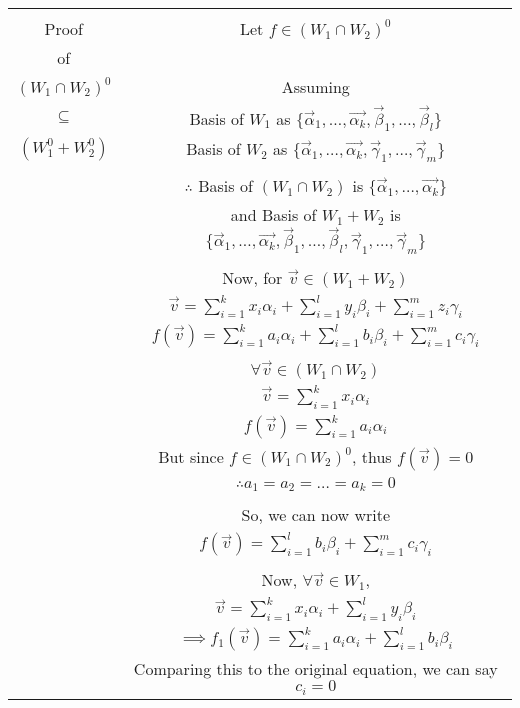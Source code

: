 \documentclass[journal,12pt,twocolumn]{IEEEtran}
\begin{document}
\begin{table}[h!]
\begin{center}
\begin{tabular}{|c|c|}
\hline
& \\
Proof & Let $f \in (W_1 \cap W_2)^0$\\
of & \\
$(W_1 \cap W_2)^0$ & Assuming\\
$\subseteq$ & Basis of $W_1$ as $\{ \vec{\alpha}_1,\ldots,\vec{\alpha_k}, \vec{\beta}_1,\ldots,\vec{\beta}_l \}$\\
$(W_1^0 + W_2^0)$ & Basis of $W_2$ as $\{ \vec{\alpha}_1,\ldots,\vec{\alpha_k}, \vec{\gamma}_1,\ldots,\vec{\gamma}_m \}$\\
& \\
& $\therefore$ Basis of $(W_1 \cap W_2)$ is $\{ \vec{\alpha}_1,\ldots,\vec{\alpha_k} \}$\\
& and Basis of $W_1 + W_2$ is $\{ \vec{\alpha}_1,\ldots,\vec{\alpha_k}, \vec{\beta}_1,\ldots,\vec{\beta}_l, \vec{\gamma}_1,\ldots,\vec{\gamma}_m\}$\\
& \\
& Now, for $\vec{v} \in (W_1 + W_2)$\\
& $\vec{v} = \sum_{i=1}^{k} x_i\alpha_i + \sum_{i=1}^{l} y_i\beta_i + \sum_{i=1}^{m} z_i\gamma_i$\\
& $f(\vec{v}) = \sum_{i=1}^{k} a_i\alpha_i + \sum_{i=1}^{l} b_i\beta_i + \sum_{i=1}^{m} c_i\gamma_i$\\
& \\
& $\forall \vec{v} \in (W_1 \cap W_2)$\\
& $\vec{v} = \sum_{i=1}^{k} x_i\alpha_i$\\
& $f(\vec{v}) = \sum_{i=1}^{k} a_i\alpha_i$\\
& But since $f \in (W_1 \cap W_2)^0$, thus $f(\vec{v}) = 0$\\
& $\therefore a_1 = a_2 = \ldots = a_k = 0$\\
& \\
& So, we can now write\\
& $f(\vec{v}) = \sum_{i=1}^{l} b_i\beta_i + \sum_{i=1}^{m} c_i\gamma_i$\\
& \\
& Now, $\forall \vec{v} \in W_1$,\\
& $\vec{v} = \sum_{i=1}^{k} x_i\alpha_i + \sum_{i=1}^{l} y_i\beta_i$\\
& $\implies f_1(\vec{v}) = \sum_{i=1}^{k} a_i\alpha_i + \sum_{i=1}^{l} b_i\beta_i$\\
& Comparing this to the original equation, we can say $c_i = 0$\\

\end{tabular}
\end{center}
\end{table}
\end{document}
